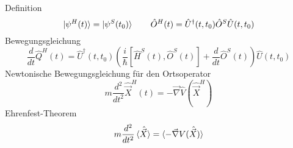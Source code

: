 Definition \cite[Glg. 3.46]{qm}
\begin{equation*}
    \ket{\psi^H(t)} = \ket{\psi^S(t_0)} \qquad \hat{O}^H(t) = \hat{U}^\dagger(t, t_0)\hat{O}^S\hat{U}(t, t_0)
\end{equation*}
Bewegungsgleichung \cite[Glg. 3.51]{qm}
\begin{equation*}
    \frac{d}{dt}\hat{Q}^H(t) = \hat{U}^\dagger(t, t_0)\left( \frac{i}{\hbar}[\hat{H}^S(t), \hat{O}^S(t)] + \frac{d}{dt}\hat{O}^S(t)\right) \hat{U}(t, t_0)
\end{equation*}
Newtonische Bewegungsgleichung für den Ortsoperator \cite[Glg. 3.55]{qm}
\begin{equation*}
    m\frac{d^2}{dt^2}\hat{\vec{X}}^H(t) = -\vec{\nabla}\hat{V}(\hat{\vec{X}}^H)
\end{equation*}
Ehrenfest-Theorem \cite[Glg. 3.56]{qm}
\begin{equation*}
    m\frac{d^2}{dt^2}\braket{\hat{\vec{X}}} = \braket{-\vec{\nabla}V(\hat{\vec{X}})}
\end{equation*}
